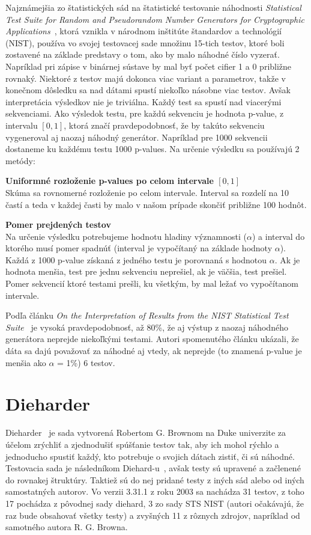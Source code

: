 Najznámejšia zo štatistických sád na štatistické testovanie náhodnosti \textit{Statistical Test Suite for Random and Pseudorandom Number Generators for Cryptographic Applications}~\parencite{nist-sts-documentation}, ktorá vznikla v národnom inštitúte štandardov a technológií (NIST), používa vo svojej testovacej sade množinu 15-tich testov, ktoré boli zostavené na základe predstavy o tom, ako by malo náhodné číslo vyzerať. Napríklad pri zápise v binárnej sústave by mal byť počet cifier 1 a 0 približne rovnaký. Niektoré z testov majú dokonca viac variant a parametrov, takže v konečnom dôsledku sa nad dátami spustí niekoľko násobne viac testov. Avšak interpretácia výsledkov nie je triviálna. Každý test sa spustí nad viacerými sekvenciami. Ako výsledok testu, pre každú sekvenciu je hodnota p-value, z intervalu $[0, 1]$, ktorá značí pravdepodobnosť, že by takúto sekvenciu vygeneroval aj naozaj náhodný generátor. Napríklad pre 1000 sekvencii dostaneme ku každému testu 1000 p-values. Na určenie výsledku sa používajú 2 metódy:
\begin{myItemize}
	\item \textbf{Uniformné rozloženie p-values po celom intervale $[0, 1]$}\\Skúma sa rovnomerné rozloženie po celom intervale. Interval sa rozdelí na 10 častí a teda v každej časti by malo v našom prípade skončiť približne 100 hodnôt.
	\item \textbf{Pomer prejdených testov}\\Na určenie výsledku potrebujeme hodnotu hladiny významnosti ($\alpha$) a interval do ktorého musí pomer spadnúť (interval je vypočítaný na základe hodnoty $\alpha$). Každá z 1000 p-value získaná z jedného testu je porovnaná s hodnotou $\alpha$. Ak je hodnota menšia, test pre jednu sekvenciu neprešiel, ak je väčšia, test prešiel. Pomer sekvencií ktoré testami prešli, ku všetkým, by mal ležať vo vypočítanom intervale.
\end{myItemize}
Podľa článku \textit{On the Interpretation of Results from the NIST Statistical Test Suite}~\parencite{nist-sts-interpretation-syso} je vysoká pravdepodobnosť, až 80\%, že aj výstup z naozaj náhodného generátora neprejde niekoľkými testami. Autori spomenutého článku ukázali, že dáta sa dajú považovať za náhodné aj vtedy, ak neprejde (to znamená p-value je menšia ako $\alpha$ = 1\%) 6 testov.

\section{Dieharder}
\label{sec:dieharder}
Dieharder~\parencite{dieharder} je sada vytvorená Robertom G. Brownom na Duke univerzite za účelom zrýchliť a zjednodušiť spúšťanie testov tak, aby ich mohol rýchlo a jednoducho spustiť každý, kto potrebuje o svojich dátach zistiť, či sú náhodné. Testovacia sada je následníkom Diehard-u~\parencite{diehard}, avšak testy sú upravené a začlenené do rovnakej štruktúry. Taktiež sú do nej pridané testy z iných sád alebo od iných samostatných autorov. Vo verzii 3.31.1 z roku 2003 sa nachádza 31 testov, z toho 17 pochádza z pôvodnej sady diehard, 3 zo sady STS NIST (autori očakávajú, že raz bude obsahovať všetky testy) a zvyšných 11 z rôznych zdrojov, napríklad od samotného autora R. G. Browna.

